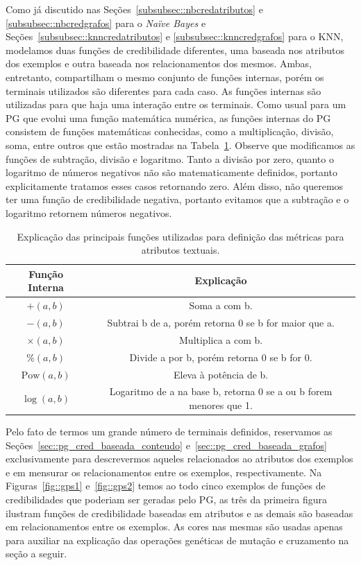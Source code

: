 Como já discutido nas Seções~\ref{subsubsec::nbcredatributos} e \ref{subsubsec::nbcredgrafos} para o \textit{Naïve Bayes} e Seções~\ref{subsubsec::knncredatributos} e \ref{subsubsec::knncredgrafos} para o \textsc{KNN}, modelamos duas funções de credibilidade diferentes, uma baseada nos atributos dos exemplos e outra baseada nos relacionamentos dos mesmos.
Ambas, entretanto, compartilham o mesmo conjunto de funções internas, porém os terminais utilizados são diferentes para cada caso. As funções internas são utilizadas para que haja uma interação entre os terminais.
Como usual para um \textsc{PG} que evolui uma função matemática numérica, as funções internas do \textsc{PG} consistem de funções matemáticas conhecidas, como a multiplicação, divisão, soma, entre outros que estão mostradas na Tabela~\ref{table::funcoespg}. 
Observe que modificamos as funções de subtração, divisão e logaritmo.
Tanto a divisão por zero, quanto o logaritmo de números negativos não são matematicamente definidos, portanto explicitamente tratamos esses casos retornando zero. Além disso, não queremos ter uma função de credibilidade negativa, portanto evitamos que a subtração e o logaritmo retornem números negativos.

\begin{table}[ht*]
\centering
\begin{tabular}{|c|c|}
\toprule
    \textbf{Função Interna} & \textbf{Explicação} \\
\midrule
    $+(a,b)$           & Soma a com b. \tabularnewline \hline
    $-(a,b)$           & Subtrai b de a, porém retorna 0 se b for maior que a.\tabularnewline \hline
    $\times(a,b) $     & Multiplica a com b. \tabularnewline \hline
    $\%(a,b)$          & Divide a por b, porém retorna 0 se b for 0. \tabularnewline \hline
    $\text{Pow}(a,b)$  & Eleva à potência de b. \tabularnewline \hline 
    $\log(a,b) $       & Logaritmo de a na base b, retorna 0 se a ou b forem menores que 1. \tabularnewline
\bottomrule
\end{tabular}
\caption{Explicação das principais funções utilizadas para definição das métricas para atributos textuais.}
\label{table::funcoespg}
\end{table}

Pelo fato de termos um grande número de terminais definidos, reservamos as Seções~\ref{sec::pg_cred_baseada_conteudo} e~\ref{sec::pg_cred_baseada_grafos} exclusivamente para descrevermos aqueles relacionados ao atributos dos exemplos e em mensurar os relacionamentos entre os exemplos, respectivamente. Na Figuras~\ref{fig::gps1} e~\ref{fig::gps2} temos ao todo cinco exemplos de funções de credibilidades que poderiam ser geradas pelo \textsc{PG}, as três da primeira figura ilustram funções de credibilidade baseadas em atributos e as demais são baseadas em relacionamentos entre os exemplos. As cores nas mesmas são usadas apenas para auxiliar na explicação das operações genéticas de mutação e cruzamento na seção a seguir.

